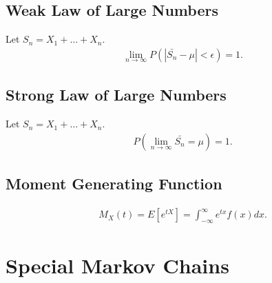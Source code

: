 \documentclass{article}
\begin{document}
\subsection{Weak Law of Large Numbers}
Let $S_n = X_1 + \dots + X_n$. 
\begin{align*}
    & \lim_{n\rightarrow\infty}P(|\bar{S_n}-\mu|<\epsilon) = 1.
\end{align*}

\subsection{Strong Law of Large Numbers}
Let $S_n = X_1 + \dots + X_n$.
\begin{align*}
    & P(\lim_{n\rightarrow\infty}\bar{S_n}=\mu) = 1.
\end{align*}

\subsection{Moment Generating Function}
\begin{align*}
    & M_X(t) = E[e^{tX}] = \int_{-\infty}^\infty e^{tx}f(x)dx.
\end{align*}

\newpage
\section{Special Markov Chains}
\end{document}
